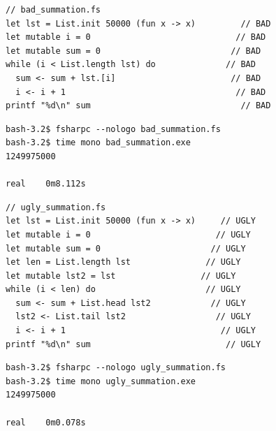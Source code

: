 \documentclass[rgb]{beamer}
\begin{document}
\begin{frame}[fragile]
\begin{footnotesize}


\begin{lstlisting}[numbers=none,frame=none]
// bad_summation.fs
let lst = List.init 50000 (fun x -> x)         // BAD
let mutable i = 0                             // BAD
let mutable sum = 0                          // BAD
while (i < List.length lst) do              // BAD
  sum <- sum + lst.[i]                       // BAD
  i <- i + 1                                  // BAD
printf "%d\n" sum                              // BAD
\end{lstlisting}


\begin{verbatim}
bash-3.2$ fsharpc --nologo bad_summation.fs
bash-3.2$ time mono bad_summation.exe
1249975000

real	0m8.112s
\end{verbatim}

\end{footnotesize}
\end{frame}

\begin{frame}[fragile]
\begin{footnotesize}


\begin{lstlisting}[numbers=none,frame=none]
// ugly_summation.fs
let lst = List.init 50000 (fun x -> x)     // UGLY
let mutable i = 0                         // UGLY
let mutable sum = 0                      // UGLY
let len = List.length lst               // UGLY
let mutable lst2 = lst                 // UGLY
while (i < len) do                      // UGLY
  sum <- sum + List.head lst2            // UGLY
  lst2 <- List.tail lst2                  // UGLY
  i <- i + 1                               // UGLY
printf "%d\n" sum                           // UGLY
\end{lstlisting}


\begin{verbatim}
bash-3.2$ fsharpc --nologo ugly_summation.fs
bash-3.2$ time mono ugly_summation.exe
1249975000

real	0m0.078s
\end{verbatim}

\end{footnotesize}
\end{frame}
\end{document}
